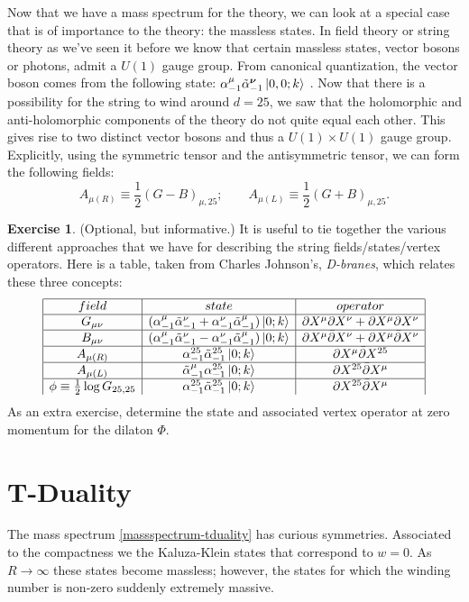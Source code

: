 \documentclass{report}
\theoremstyle{plain}
\theoremstyle{definition}
\newtheorem{exercise}{Exercise}[section]
\theoremstyle{remark}
\newcommand{\FR}[2]{\frac{#1}{#2}}
\newcommand{\di}{\partial}
\newcommand{\colr}[1]{ {\color{red} #1 } }
\begin{document}
Now that we have a mass spectrum for the theory, we can look at a
special case that is of importance to the theory: the massless states.
In field theory or string theory as we've seen it before we know that
certain massless states, vector bosons or photons, admit a $U(1)$
gauge group. From canonical quantization, the vector boson comes from the
following state: \colr{$\alpha^\mu_{-1}\tilde\alpha^{\bm\nu}_{-1}\ket{0,0;k}$}. 
Now that there is a possibility for the string to wind around
$d=25$, we saw that the holomorphic and anti-holomorphic components of the
theory do not quite equal each other. This gives rise to two distinct
vector bosons and thus a $U(1)\times U(1)$ gauge group. Explicitly, using
the symmetric tensor and the antisymmetric tensor, we can form the
following fields:
\[ A_{\mu(R)} \equiv \FR{1}{2}(G-B)_{\mu,25};\qquad
A_{\mu(L)} \equiv \FR{1}{2}(G+B)_{\mu,25}.\]
\begin{exercise}(Optional, but informative.) It is useful to tie together
    the various different approaches that we have for describing the
    string fields/states/vertex operators. Here is a table, taken from
    Charles Johnson's, \emph{D-branes}, which relates these three concepts:
    \begin{align*}
    \begin{array}{|c|c|c|}
        \hline
        field & state & operator\\
        \hline
G_{\mu\nu} & (\alpha^\mu_{-1}\tilde\alpha^\nu_{-1} + \alpha^\nu_{-1}\tilde\alpha^\mu_{-1})\ket{0;k} & \di X^\mu\di X^\nu + \di X^\mu\di X^\nu\\
        \hline
B_{\mu\nu} & (\alpha^\mu_{-1}\tilde\alpha^\nu_{-1} - \alpha^\nu_{-1}\tilde\alpha^\mu_{-1})\ket{0;k} & \di X^\mu\bar\di X^\nu + \di X^\mu\bar\di X^\nu\\
        \hline
A_{\mu(R)} & \alpha^{25}_{-1}\tilde\alpha^{25}_{-1}\ket{0;k} & \di X^\mu\bar\di X^{25}\\
        \hline
A_{\mu(L)} & \tilde\alpha^{\mu}_{-1}\alpha^{25}_{-1}\ket{0;k} & \di X^{25}\bar\di X^\mu\\
        \hline
\phi \equiv \FR{1}{2}\log G_{25,25} & \alpha^{25}_{-1}\tilde\alpha^{25}_{-1}\ket{0;k} & \di X^{25}\bar\di X^\mu
    \end{array}
    \end{align*}
    As an extra exercise, determine the state and associated vertex
    operator at zero momentum for the dilaton $\Phi$.
\end{exercise}

\section{T-Duality}
The mass spectrum \eqref{massspectrum-tduality} has curious symmetries.
Associated to the compactness we the Kaluza-Klein states that correspond to
$w=0$. As $R\to\infty$ these states become massless; however, the states
for which the winding number is non-zero suddenly extremely massive.
\end{document}
